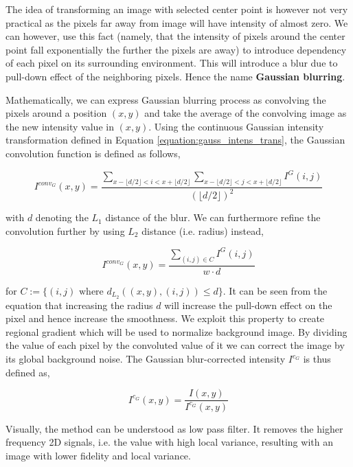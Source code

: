 \documentclass[pdftex,12pt,a4paper]{report}
\begin{document}
The idea of transforming an image with selected center point is however not very practical as the pixels far away from image will have intensity of almost zero. We can however, use this fact (namely, that the intensity of pixels around the center point fall exponentially the further the pixels are away) to introduce dependency of each pixel on its surrounding environment. This will introduce a blur due to pull-down effect of the neighboring pixels. Hence the name \textbf{Gaussian blurring}.

Mathematically, we can express Gaussian blurring process as convolving the pixels around a position $(x, y)$ and take the average of the convolving image as the new intensity value in $(x, y)$. Using the continuous Gaussian intensity transformation defined in Equation \ref{equation:gauss_intens_trans}, the Gaussian convolution  function is defined as follows,

$$
I^{conv_G}(x, y) = \frac{\sum_{x - \lfloor d/2 \rfloor < i < x + \lfloor d/2 \rfloor} \sum_{x - \lfloor d/2 \rfloor < j < x + \lfloor d/2 \rfloor} I^G(i, j)}{(\lfloor d/2 \rfloor)^2}
$$

with $d$ denoting the $L_1$ distance of the blur.  We can furthermore refine the convolution further by using $L_2$ distance (i.e. radius) instead,

\begin{equation}
I^{conv_G}(x, y) = \frac{\sum_{(i, j) \in C}  I^G(i, j)}{w \cdot d}
\label{equation:conv_gaussian_cont}
\end{equation}

for $C := \{(i, j)  \text{  where } d_{L_2}((x, y), (i, j)) \leq d\}$. It can be seen from the equation that increasing the radius $d$ will increase the pull-down effect on the pixel and hence increase the smoothness. We exploit this property to create regional gradient which will be used to normalize background image. By dividing the value of each pixel by the convoluted value of it we can correct the image by its global background noise. The Gaussian blur-corrected intensity $I^{c_G}$ is thus defined as,

\begin{equation}
I^{c_G}(x, y) = \frac{I(x, y)}{I^{c_G}(x, y)} 
\label{equation:gauss_blur_correction}
\end{equation}

Visually, the method can be understood as low pass filter. It removes the higher frequency 2D signals, i.e. the value with high local variance, resulting with an image with lower fidelity and local variance.
\end{document}

